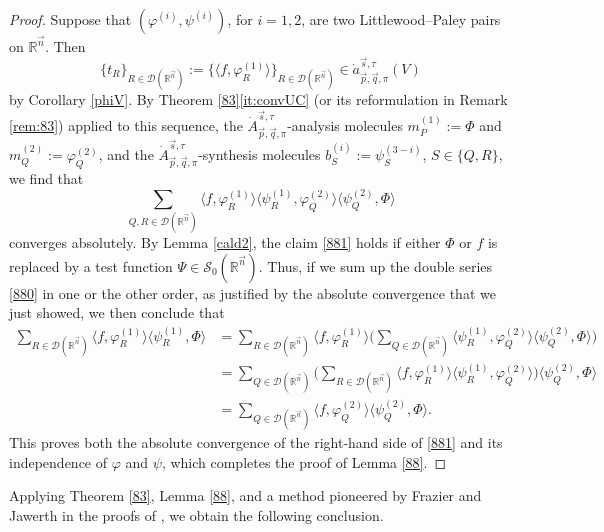 \documentclass[11pt, reqno]{amsart}
\theoremstyle{definition}
\theoremstyle{remark}
\numberwithin{equation}{section}
\newcommand{\R}{\mathbb R}
\newcommand{\vn}{\vec n}
\newcommand{\vp}{\vec p}
\newcommand{\vq}{\vec q}
\newcommand{\vs}{\vec s}
\newcommand{\Atau}{\dot A^{\vs,\tau}_{\vp,\vq,\pi}}
\newcommand{\atau}{\dot a^{\vs,\tau}_{\vp,\vq,\pi}}
\begin{document}
\begin{proof}
Suppose that $(\varphi^{(i)},\psi^{(i)})$, for $i=1,2$,
are two Littlewood--Paley pairs on $\R^{\vn}$.
Then
$$\{t_R\}_{R\in\mathscr D(\R^{\vn})}:=\Big\{\Big\langle f,\varphi_R^{(1)}\Big\rangle\Big\}_{R\in\mathscr D(\R^{\vn})}\in\atau(V)$$
by Corollary \ref{phiV}.
By Theorem \ref{83}\eqref{it:convUC} (or its reformulation in Remark \ref{rem:83}) applied to
this sequence, the $\Atau$-analysis molecules $m_P^{(1)}:=\Phi$ and $m^{(2)}_Q:=\varphi^{(2)}_Q$, and the $\Atau$-synthesis molecules $b_S^{(i)}:=\psi_S^{(3-i)}$, $S\in\{Q,R\}$, we find that
\begin{equation}\label{880}
\sum_{Q,R\in\mathscr D(\R^{\vn})}\Big\langle f,\varphi_R^{(1)}\Big\rangle
\Big\langle\psi_R^{(1)},\varphi_Q^{(2)}\Big\rangle
\Big\langle\psi_Q^{(2)},\Phi\Big\rangle
\end{equation}
converges absolutely. By Lemma \ref{cald2},
the claim \eqref{881} holds if either $\Phi$ or $f$
is replaced by a test function $\Psi\in\mathscr S_0(\R^{\vn})$.
Thus, if we sum up the double series \eqref{880} in one or the other order,
as justified by the absolute convergence that we just showed,
we then conclude that
\begin{align*}
\sum_{R\in\mathscr D(\R^{\vn})}\Big\langle f,\varphi_R^{(1)}\Big\rangle
\Big\langle\psi_R^{(1)},\Phi\Big\rangle
&=\sum_{R\in\mathscr D(\R^{\vn})}\Big\langle f,\varphi_R^{(1)}\Big\rangle
\Big(\sum_{Q\in\mathscr D(\R^{\vn})}
\Big\langle\psi_R^{(1)},\varphi_Q^{(2)}\Big\rangle
\Big\langle\psi_Q^{(2)},\Phi\Big\rangle\Big) \\
&=\sum_{Q\in\mathscr D(\R^{\vn})}\Big(\sum_{R\in\mathscr D(\R^{\vn})}
\Big\langle f,\varphi_R^{(1)}\Big\rangle
\Big\langle\psi_R^{(1)},\varphi_Q^{(2)}\Big\rangle\Big)
\Big\langle\psi_Q^{(2)},\Phi\Big\rangle\\
&=\sum_{Q\in\mathscr D(\R^{\vn})}\Big\langle f,\varphi_Q^{(2)}\Big\rangle
\Big\langle\psi_Q^{(2)},\Phi\Big\rangle.
\end{align*}
This proves both the absolute convergence of the right-hand side of \eqref{881}
and its independence of $\varphi$ and $\psi$,
which completes the proof of Lemma \ref{88}.
\end{proof}

Applying Theorem \ref{83}, Lemma \ref{88}, and a method pioneered by
Frazier and Jawerth in the proofs of \cite[Theorems 3.5 and 3.7]{FJ90},
we obtain the following conclusion.
\end{document}
